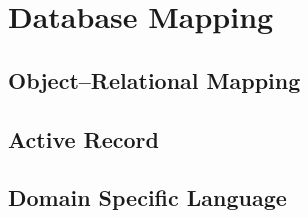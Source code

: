 \section{Database Mapping}

\subsection{Object–Relational Mapping}

\subsection{Active Record}

\subsection{Domain Specific Language}
